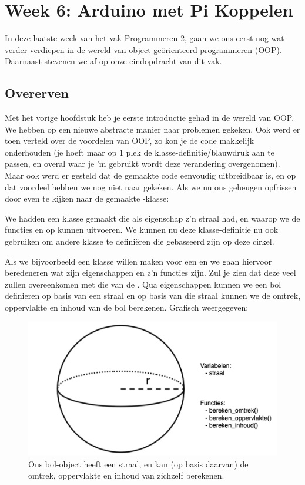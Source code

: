 \chapter{Week 6: Arduino met Pi Koppelen}

In deze laatste week van het vak Programmeren 2, gaan we ons eerst nog wat verder verdiepen in de wereld van object geörienteerd programmeren (OOP). Daarnaast stevenen we af op onze eindopdracht van dit vak.

\section{Overerven}
Met het vorige hoofdstuk heb je eerste introductie gehad in de wereld van OOP. We hebben op een nieuwe abstracte manier naar problemen gekeken. Ook werd er toen verteld over de voordelen van OOP, zo kon je de code makkelijk onderhouden (je hoeft maar op $1$ plek de klasse-definitie/blauwdruk aan te passen, en overal waar je 'm gebruikt wordt deze verandering overgenomen). Maar ook werd er gesteld dat de gemaakte code eenvoudig uitbreidbaar is, en op dat voordeel hebben we nog niet naar gekeken. Als we nu ons geheugen opfrissen door even te kijken naar de gemaakte -klasse:


We hadden een klasse  gemaakt die als eigenschap z'n straal had, en waarop we de functies  en  op kunnen uitvoeren. We kunnen nu deze klasse-definitie nu ook gebruiken om andere klasse te definiëren die gebasseerd zijn op deze cirkel. \newline 

Als we bijvoorbeeld een klasse willen maken voor een  en we gaan hiervoor beredeneren wat zijn eigenschappen en z'n functies zijn. Zul je zien dat deze veel zullen overeenkomen met die van de . Qua eigenschappen kunnen we een bol definieren op basis van een straal en op basis van die straal kunnen we de omtrek, oppervlakte en inhoud van de bol berekenen. Grafisch weergegeven:
\begin{figure}[h!]
\centering\includegraphics[scale=0.7]{Pictures/chapter08/bol.png}
\caption{\small Ons bol-object heeft een straal, en kan (op basis daarvan) de omtrek, oppervlakte en inhoud van zichzelf berekenen.}
\label{fig:bol} %
\end{figure}

